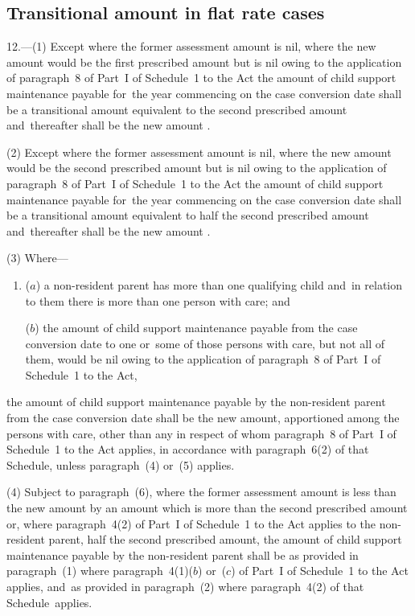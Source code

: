 \documentclass[12pt,a4paper]{article}
\begin{document}
\subsection[12. Transitional amount in flat rate cases]{Transitional amount in flat rate cases}

12.---(1)  Except where the former assessment amount is nil, where the new amount would be the first prescribed amount but is nil owing to the application of paragraph~8 of Part~I of Schedule~1 to the Act the amount of child support maintenance payable for~the year commencing on the case conversion date shall be a transitional amount equivalent to the second prescribed amount and~thereafter shall be the new amount%
.

(2) Except where the former assessment amount is nil, where the new amount would be the second prescribed amount but is nil owing to the application of paragraph~8 of Part~I of Schedule~1 to the Act the amount of child support maintenance payable for~the year commencing on the case conversion date shall be a transitional amount equivalent to half the second prescribed amount and~thereafter shall be the new amount%
.

(3) Where—
\begin{enumerate}\item[]
($a$) a non-resident parent has more than one qualifying child and~in relation to them there is more than one person with care; and

($b$) the amount of child support maintenance payable from the case conversion date to one or~some of those persons with care, but not all of them, would be nil owing to the application of paragraph~8 of Part~I of Schedule~1 to the Act,
\end{enumerate}
the amount of child support maintenance payable by the non-resident parent from the case conversion date shall be the new amount, apportioned 
among the persons with care, other than any in respect of whom paragraph~8 of Part~I of Schedule~1 to the Act applies, in accordance with paragraph~6(2) of that Schedule, unless paragraph~(4) or~(5) applies.  %

(4) Subject to paragraph~(6), where the former assessment amount is less than the new amount by an amount which is more than the second prescribed amount or, where paragraph~4(2) of Part~I of Schedule~1 to the Act applies to the non-resident parent, half the second prescribed amount, the amount of child support maintenance payable by the non-resident parent shall be as provided in paragraph~(1) where paragraph~4(1)($b$)  
or~($c$)  %
of Part~I of Schedule~1 to the Act applies, and~as provided in paragraph~(2) where paragraph~4(2) of that Schedule~applies.
\end{document}
